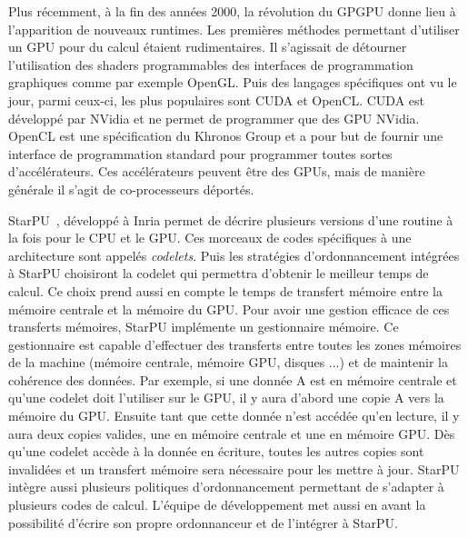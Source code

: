 Plus récemment, à la fin des années 2000, la révolution du GPGPU donne lieu à l'apparition de nouveaux runtimes.
%
Les premières méthodes permettant d'utiliser un GPU pour du calcul étaient rudimentaires.
%
Il s'agissait de détourner l'utilisation des shaders programmables des interfaces de programmation graphiques comme par exemple OpenGL.
%
Puis des langages spécifiques ont vu le jour, parmi ceux-ci, les plus populaires sont CUDA et OpenCL.
%
CUDA est développé par NVidia et ne permet de programmer que des GPU NVidia.
%
OpenCL est une spécification du Khronos Group et a pour but de fournir une interface de programmation standard pour programmer toutes sortes d'accélérateurs.
%
Ces accélérateurs peuvent être des GPUs, mais de manière générale il s'agit de co-processeurs déportés.

StarPU~\cite{starpu}, développé à Inria permet de décrire plusieurs versions d'une routine à la fois pour le CPU et le GPU.
%
Ces morceaux de codes spécifiques à une architecture sont appelés {\em codelets}.
%
Puis les stratégies d'ordonnancement intégrées à StarPU choisiront la codelet qui permettra d'obtenir le meilleur temps de calcul.
%
Ce choix prend aussi en compte le temps de transfert mémoire entre la mémoire centrale et la mémoire du GPU.
%
Pour avoir une gestion efficace de ces transferts mémoires, StarPU implémente un gestionnaire mémoire.
%
Ce gestionnaire est capable d'effectuer des transferts entre toutes les zones mémoires de la machine (mémoire centrale, mémoire GPU, disques ...) et de maintenir la cohérence des données.
%
Par exemple, si une donnée A est en mémoire centrale et qu'une codelet doit l'utiliser sur le GPU, il y aura d'abord une copie A vers la mémoire du GPU.
%
Ensuite tant que cette donnée n'est accédée qu'en lecture, il y aura deux copies valides, une en mémoire centrale et une en mémoire GPU.
%
Dès qu'une codelet accède à la donnée en écriture, toutes les autres copies sont invalidées et un transfert mémoire sera nécessaire pour les mettre à jour.
%
StarPU intègre aussi plusieurs politiques d'ordonnancement permettant de s'adapter à plusieurs codes de calcul.
%
L'équipe de développement met aussi en avant la possibilité d'écrire son propre ordonnanceur et de l'intégrer à StarPU.

